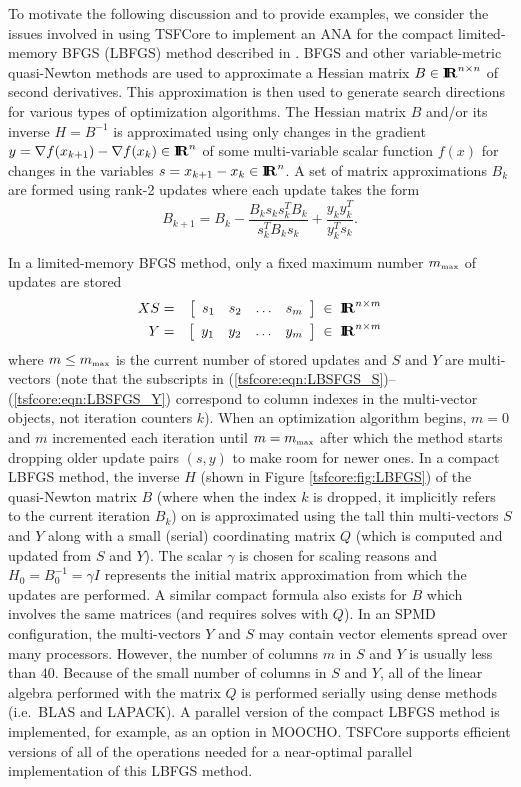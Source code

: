 To motivate the following discussion and to provide examples, we
consider the issues involved in using TSFCore to implement an ANA for
the compact limited-memory BFGS (LBFGS) method described in
{}\cite{ref:byrd_et_all_lbfgs_1994}.  BFGS and other variable-metric
quasi-Newton methods are used to approximate a Hessian matrix
$B\in\RE^{n \times n}$ of second derivatives.  This approximation is
then used to generate search directions for various types of
optimization algorithms.  The Hessian matrix $B$ and/or its inverse $H
= B^{-1}$ is approximated using only changes in the gradient $y =
\nabla f(x_{k+1}) - \nabla f(x_k) \in \RE^n$ of some multi-variable scalar
function $f(x)$ for changes in the variables $s = x_{k+1} - x_k \in
\RE^n$.  A set of matrix approximations $B_k$ are formed using rank-2
updates where each update takes the form
%
\begin{equation}
B_{k+1} = B_k - \frac{B_k s_k s_k^T B_k}{s_k^T B_k s_k} + \frac{y_k y_k^T}{y_k^T s_k}.
\end{equation}

In a limited-memory BFGS method, only a fixed maximum number
$m_{\tiny\mbox{max}}$ of updates are stored
%
\begin{eqnarray}
XS & = & {\bmat{cccc} s_1 & s_2 & \ldots & s_{m} \emat} \label{tsfcore:eqn:LBSFGS_S} \; \in \; \RE^{n \times m}\\
Y & = & {\bmat{cccc} y_1 & y_2 & \ldots & y_{m} \emat} \label{tsfcore:eqn:LBSFGS_Y} \; \in \; \RE^{n \times m}
\end{eqnarray}
%
where $m \le m_{\tiny\mbox{max}}$ is the current number of stored
updates and $S$ and $Y$ are multi-vectors (note that the subscripts in
(\ref{tsfcore:eqn:LBSFGS_S})--(\ref{tsfcore:eqn:LBSFGS_Y}) correspond
to column indexes in the multi-vector objects, not iteration counters
$k$).  When an optimization algorithm begins, $m=0$ and $m$
incremented each iteration until $m = m_{\tiny\mbox{max}}$ after which
the method starts dropping older update pairs $(s,y)$ to make room for
newer ones.  In a compact LBFGS method, the inverse $H$ (shown in
Figure {}\ref{tsfcore:fig:LBFGS}) of the quasi-Newton matrix $B$
(where when the index $k$ is dropped, it implicitly refers to the
current iteration $B_k$) on is approximated using the tall thin
multi-vectors $S$ and $Y$ along with a small (serial) coordinating
matrix $Q$ (which is computed and updated from $S$ and $Y$).  The
scalar $\gamma$ is chosen for scaling reasons and $H_0 = B_0^{-1} =
\gamma I$ represents the initial matrix approximation from which the
updates are performed.  A similar compact formula also exists for $B$
which involves the same matrices (and requires solves with $Q$).  In
an SPMD configuration, the multi-vectors $Y$ and $S$ may contain
vector elements spread over many processors.  However, the number of
columns $m$ in $S$ and $Y$ is usually less than $40$.  Because of the
small number of columns in $S$ and $Y$, all of the linear algebra
performed with the matrix $Q$ is performed serially using dense
methods (i.e.~BLAS and LAPACK).  A parallel version of the compact
LBFGS method is implemented, for example, as an option in MOOCHO.
TSFCore supports efficient versions of all of the operations needed
for a near-optimal parallel implementation of this LBFGS method.

